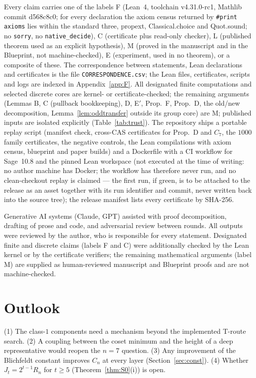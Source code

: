 \documentclass[11pt]{amsart}
\theoremstyle{remark}\newtheorem{remark}[theorem]{Remark}
\theoremstyle{definition}\newtheorem{definition}[theorem]{Definition}
\begin{document}
Every claim carries one of the labels F (Lean~4, toolchain v4.31.0-rc1, Mathlib commit d568c8c0; for every declaration the axiom census returned by \texttt{\#print axioms} lies within the standard three, propext, Classical.choice and Quot.sound; no \texttt{sorry}, no \texttt{native\_decide}), C (certificate plus read-only checker), L (published theorem used as an explicit hypothesis), M (proved in the manuscript and in the Blueprint, not machine-checked), E (experiment, used in no theorem), or a composite of these. The correspondence between statements, Lean declarations and certificates is the file \texttt{CORRESPONDENCE.csv}; the Lean files, certificates, scripts and logs are indexed in Appendix~\ref{app:F}. All designated finite computations and selected discrete cores are kernel- or certificate-checked; the remaining arguments (Lemmas B, C (pullback bookkeeping), D, E$'$, Prop.~F, Prop.~D, the old/new decomposition, Lemma~\ref{lem:oddtransfer} outside its group core) are M; published inputs are isolated explicitly (Table~\ref{tab:trust}). The repository ships a portable replay script (manifest check, cross-CAS certificates for Prop.~D and $C_7$, the $1000$ family certificates, the negative controls, the Lean compilations with axiom census, blueprint and paper builds) and a Dockerfile with a CI workflow for Sage~10.8 and the pinned Lean workspace (not executed at the time of writing: no author machine has Docker; the workflow has therefore never run, and no clean-checkout replay is claimed --- the first run, if green, is to be attached to the release as an asset together with its run identifier and commit, never written back into the source tree); the release manifest lists every certificate by SHA-256.

Generative AI systems (Claude, GPT) assisted with proof decomposition, drafting of prose and code, and adversarial review between rounds. All outputs were reviewed by the author, who is responsible for every statement. Designated finite and discrete claims (labels F and C) were additionally checked by the Lean kernel or by the certificate verifiers; the remaining mathematical arguments (label M) are supplied as human-reviewed manuscript and Blueprint proofs and are not machine-checked.

\section{Outlook}
(1) The class-$1$ components need a mechanism beyond the implemented T-route search. (2) A coupling between the coset minimum and the height of a deep representative would reopen the $n=7$ question. (3) Any improvement of the Blichfeldt constant improves $C_n$ at every layer (Section~\ref{sec:const}). (4) Whether $J_t=2^{t-1}R_n$ for $t\ge5$ (Theorem~\ref{thm:S0}(i)) is open.
\end{document}
